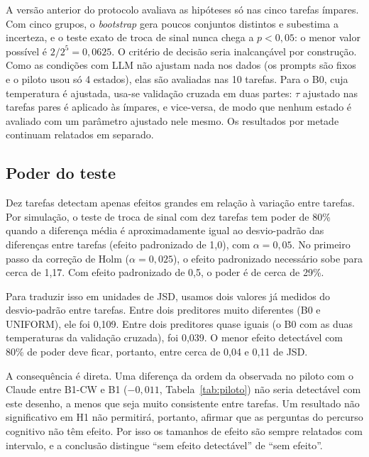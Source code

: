 \documentclass[12pt,oneside,a4paper,chapter=TITLE,english,brazil]{abntex2}
\begin{document}
A versão anterior do protocolo avaliava as hipóteses só nas cinco tarefas ímpares. Com cinco grupos, o \textit{bootstrap} gera poucos conjuntos distintos e subestima a incerteza, e o teste exato de troca de sinal nunca chega a $p<0{,}05$: o menor valor possível é $2/2^5 = 0{,}0625$. O critério de decisão seria inalcançável por construção. Como as condições com LLM não ajustam nada nos dados (os prompts são fixos e o piloto usou só 4 estados), elas são avaliadas nas 10 tarefas. Para o B0, cuja temperatura é ajustada, usa-se validação cruzada em duas partes: $\tau$ ajustado nas tarefas pares é aplicado às ímpares, e vice-versa, de modo que nenhum estado é avaliado com um parâmetro ajustado nele mesmo. Os resultados por metade continuam relatados em separado.

\subsection{Poder do teste}
\label{sec:poder}

\begin{real}
Dez tarefas detectam apenas efeitos grandes em relação à variação entre tarefas. Por simulação, o teste de troca de sinal com dez tarefas tem poder de 80\% quando a diferença média é aproximadamente igual ao desvio-padrão das diferenças entre tarefas (efeito padronizado de 1,0), com $\alpha=0{,}05$. No primeiro passo da correção de Holm ($\alpha=0{,}025$), o efeito padronizado necessário sobe para cerca de 1,17. Com efeito padronizado de 0,5, o poder é de cerca de 29\%.

Para traduzir isso em unidades de JSD, usamos dois valores já medidos do desvio-padrão entre tarefas. Entre dois preditores muito diferentes (B0 e UNIFORM), ele foi 0,109. Entre dois preditores quase iguais (o B0 com as duas temperaturas da validação cruzada), foi 0,039. O menor efeito detectável com 80\% de poder deve ficar, portanto, entre cerca de 0,04 e 0,11 de JSD.
\end{real}

A consequência é direta. Uma diferença da ordem da observada no piloto com o Claude entre B1-CW e B1 ($-0{,}011$, Tabela~\ref{tab:piloto}) não seria detectável com este desenho, a menos que seja muito consistente entre tarefas. Um resultado não significativo em H1 não permitirá, portanto, afirmar que as perguntas do percurso cognitivo não têm efeito. Por isso os tamanhos de efeito são sempre relatados com intervalo, e a conclusão distingue ``sem efeito detectável'' de ``sem efeito''.
\end{document}
